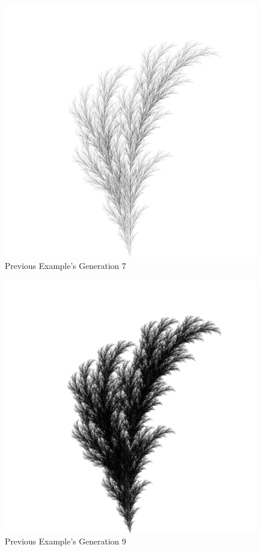 \documentclass{article}
\begin{document}
\begin{figure}[H]
  \centering
  \includegraphics[scale=.4]{treeC8.PNG}
  \caption[] {
    Previous Example's Generation 7
    \endtabular}
\end{figure}

\begin{figure}[H]
  \centering
  \includegraphics[scale=.5]{treeC9.PNG}
  \caption[] {
    Previous Example's Generation 9
    \endtabular}
\end{figure}
\end{document}
